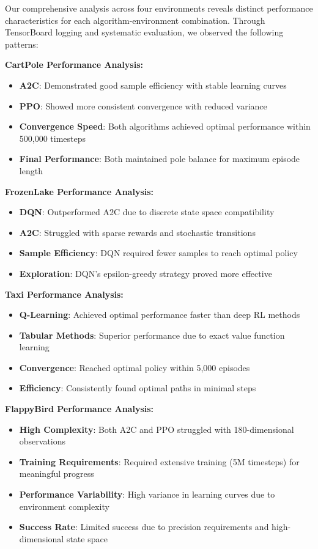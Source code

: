 \documentclass[12pt]{article}
\begin{document}
{{{Our comprehensive analysis across four environments reveals distinct performance characteristics for each algorithm-environment combination. Through TensorBoard logging and systematic evaluation, we observed the following patterns:

\textbf{CartPole Performance Analysis:}
\begin{itemize}
    \item \textbf{A2C}: Demonstrated good sample efficiency with stable learning curves
    \item \textbf{PPO}: Showed more consistent convergence with reduced variance
    \item \textbf{Convergence Speed}: Both algorithms achieved optimal performance within 500,000 timesteps
    \item \textbf{Final Performance}: Both maintained pole balance for maximum episode length
\end{itemize}

\textbf{FrozenLake Performance Analysis:}
\begin{itemize}
    \item \textbf{DQN}: Outperformed A2C due to discrete state space compatibility
    \item \textbf{A2C}: Struggled with sparse rewards and stochastic transitions
    \item \textbf{Sample Efficiency}: DQN required fewer samples to reach optimal policy
    \item \textbf{Exploration}: DQN's epsilon-greedy strategy proved more effective
\end{itemize}

\textbf{Taxi Performance Analysis:}
\begin{itemize}
    \item \textbf{Q-Learning}: Achieved optimal performance faster than deep RL methods
    \item \textbf{Tabular Methods}: Superior performance due to exact value function learning
    \item \textbf{Convergence}: Reached optimal policy within 5,000 episodes
    \item \textbf{Efficiency}: Consistently found optimal paths in minimal steps
\end{itemize}

\textbf{FlappyBird Performance Analysis:}
\begin{itemize}
    \item \textbf{High Complexity}: Both A2C and PPO struggled with 180-dimensional observations
    \item \textbf{Training Requirements}: Required extensive training (5M timesteps) for meaningful progress
    \item \textbf{Performance Variability}: High variance in learning curves due to environment complexity
    \item \textbf{Success Rate}: Limited success due to precision requirements and high-dimensional state space
\end{itemize}

}}}
\end{document}
